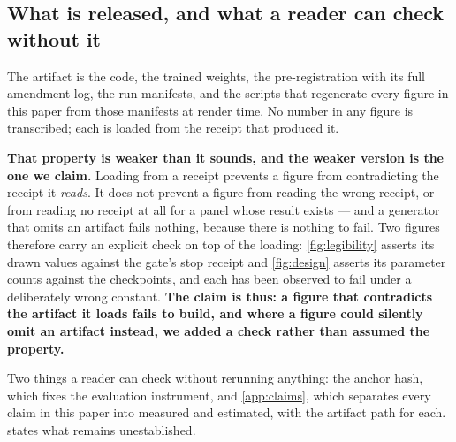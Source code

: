 \subsection{What is released, and what a reader can check without it}
\label{sec:repro-release}

The artifact is the code, the trained weights, the pre-registration with its full amendment log,
the run manifests, and the scripts that regenerate every figure in this paper from those manifests
at render time. No number in any figure is transcribed; each is loaded from the receipt that
produced it.

\textbf{That property is weaker than it sounds, and the weaker version is the one we claim.}
Loading from a receipt prevents a figure from contradicting the receipt it \emph{reads}. It does
not prevent a figure from reading the wrong receipt, or from reading no receipt at all for a panel
whose result exists --- and a generator that omits an artifact fails nothing, because there is
nothing to fail. Two figures therefore carry an explicit check on top of the loading:
\cref{fig:legibility} asserts its drawn values against the gate's stop receipt and
\cref{fig:design} asserts its parameter counts against the checkpoints, and each has been observed
to fail under a deliberately wrong constant. \textbf{The claim is thus: a figure that contradicts
the artifact it loads fails to build, and where a figure could silently omit an artifact instead,
we added a check rather than assumed the property.}

Two things a reader can check without rerunning anything: the anchor hash, which fixes the
evaluation instrument, and \cref{app:claims}, which separates every claim in this paper into
measured and estimated, with the artifact path for each.  states what remains
unestablished.
